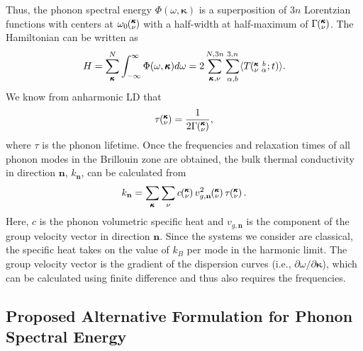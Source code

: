 \documentclass[twocolumn,10pt]{asme2e}
\newcommand{\kvbat}{\mspace{-4.0mu}\left(\mspace{-8.0mu}\begin{smallmatrix} &\pmb{\kappa} &b \\ &\nu &\alpha\end{smallmatrix}\mspace{-2.0mu};t\right)}
\newcommand{\kv}{\mspace{-4.0mu}\left(\mspace{-8.0mu}\begin{smallmatrix}&\pmb{\kappa} \\&\nu\end{smallmatrix}\mspace{-3.0mu}\right)}
\begin{document}
Thus, the phonon spectral energy $\Phi(\omega,\pmb{\kappa})$ is a superposition of $3n$ Lorentzian
functions with centers at $\omega_0\kv$ with a half-width at half-maximum of
$\Gamma\kv$.  The Hamiltonian can be written as
\begin{equation}\label{E:equipartition}
H=\sum_{\pmb{\kappa}}^{N}\int_{-\infty}^{\infty}\Phi(\omega,\pmb{\kappa})d\omega=2\sum_{\pmb{\kappa},\nu}^{N,3n}\sum_{\alpha,b}^{3,n}\langle T\kvbat\rangle.
\end{equation}
We know from anharmonic LD that \cite{maradudin1962,ladd1986}
\begin{equation}\label{E:lifetime}
\tau\kv=\frac{1}{2\Gamma\kv},
\end{equation}
where $\tau$ is the phonon lifetime. Once the frequencies and relaxation times of all phonon modes in the
Brillouin zone are obtained, the bulk thermal conductivity in direction
$\mathbf{n}$, $k_{\mathbf{n}}$, can be calculated from
\begin{equation}
	\label{E-size:k_bulk}
	k_{\mathbf{n}}=\sum_{\pmb{\kappa}} \sum_\nu c \kv v^{2}_{g,\mathbf{n}} \kv \tau \kv.
\end{equation}
Here, $c$ is the phonon volumetric specific heat and ${v}_{g,\mathbf{n}}$ is
the component of the group velocity vector in direction $\mathbf{n}$. Since the systems we consider are classical, the
specific heat takes on the value of $k_B$ per mode in the harmonic limit. The group
velocity vector is the gradient of the dispersion curves (i.e., $\partial
\omega /
\partial \pmb{\kappa}$), which can be calculated using finite difference and thus also requires the frequencies.


\subsection*{Proposed Alternative Formulation for Phonon Spectral Energy}\label{S:Properties}
\end{document}
